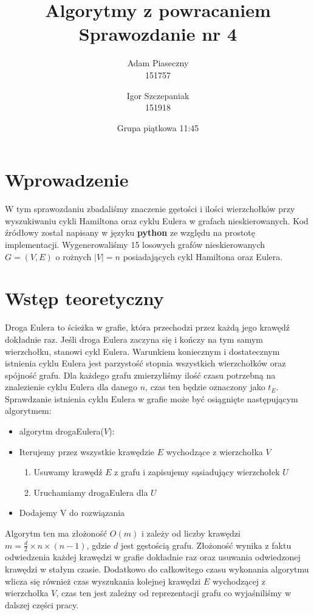 \documentclass{article}
\title{\LARGE Algorytmy z powracaniem\\ Sprawozdanie nr 4}
\author{Adam Piaseczny \\	151757 \and
				Igor Szczepaniak \\ 151918}
\date{Grupa piątkowa 11:45}
\begin{document}
\maketitle
\pagebreak

\tableofcontents
\pagebreak

\section{Wprowadzenie}

W tym sprawozdaniu zbadaliśmy znaczenie gęstości i ilości wierzchołków przy wyszukiwaniu cykli Hamiltona oraz cyklu Eulera w grafach nieskierowanych. Kod źródłowy został napisany w języku \textbf{python} ze względu na prostotę implementacji. Wygenerowaliśmy 15 losowych grafów nieskierowanych $G=(V,E)$ o rożnych $|V|=n$ posiadających cykl Hamiltona oraz Eulera.

\section{Wstęp teoretyczny}

Droga Eulera to ścieżka w grafie, która przechodzi przez każdą jego krawędź dokładnie raz. Jeśli droga Eulera zaczyna się i kończy na tym samym wierzchołku, stanowi cykl Eulera. Warunkiem koniecznym i dostatecznym istnienia cyklu Eulera jest parzystość stopnia wszystkich wierzchołków oraz spójność grafu. Dla każdego grafu zmierzyliśmy ilość czasu potrzebną na znalezienie cyklu Eulera dla danego $n$, czas ten będzie oznaczony jako $t_E$.  Sprawdzanie istnienia cyklu Eulera w grafie może być osiągnięte następującym algorytmem:

\begin{itemize}
	\item algorytm drogaEulera($V$):
	\item Iterujemy przez wszystkie krawędzie $E$ wychodzące z wierzchołka $V$
	\begin{enumerate}
		\item Usuwamy krawędź $E$ z grafu i zapisujemy sąsiadujący wierzchołek $U$
		\item Uruchamiamy drogaEulera dla $U$
	\end{enumerate}
	\item Dodajemy V do rozwiązania
\end{itemize}

Algorytm ten ma złożoność $O(m)$ i zależy od liczby krawędzi $m=\frac{d}{2}\times n \times (n-1)$, gdzie $d$ jest gęstością grafu. Złożoność wynika z faktu odwiedzenia każdej krawędzi w grafie dokładnie raz oraz usuwania odwiedzonej krawędzi w stałym czasie. Dodatkowo do całkowitego czasu wykonania algorytmu wlicza się również czas wyszukania kolejnej krawędzi $E$ wychodzącej z wierzchołka $V$, czas ten jest zależny od reprezentacji grafu co wyjaśniliśmy w dalszej części pracy.
\end{document}
